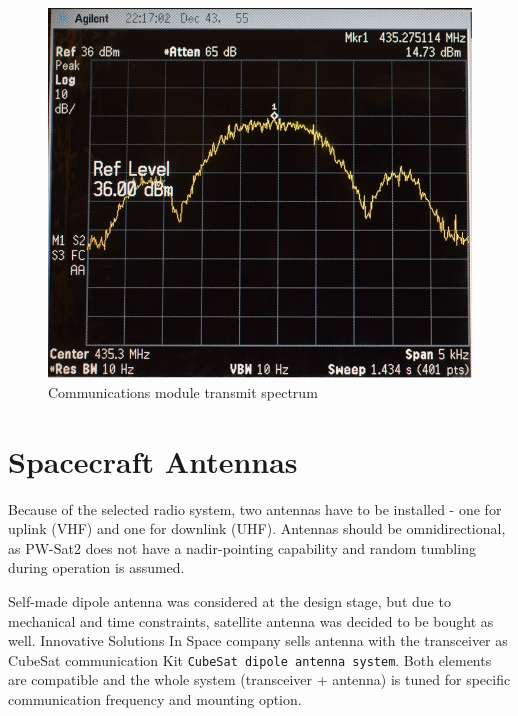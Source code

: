 \begin{figure}[H]
    \centering
    \includegraphics[width=0.6\paperwidth]{img/6/tx_spectrum.jpg}
    \caption{Communications module transmit spectrum}
    \label{tx_spectrum}
\end{figure}









\section{Spacecraft Antennas}
Because of the selected radio system, two antennas have to be installed - one for uplink (VHF) and one for downlink (UHF). Antennas should be omnidirectional, as PW-Sat2 does not have a nadir-pointing capability and random tumbling during operation is assumed.

Self-made dipole antenna was considered at the design stage, but due to mechanical and time constraints, satellite antenna was decided to be bought as well. Innovative Solutions In Space company sells antenna with the transceiver as CubeSat communication Kit \texttt{CubeSat dipole antenna system}. Both elements are compatible and the whole system (transceiver + antenna) is tuned for specific communication frequency and mounting option.

